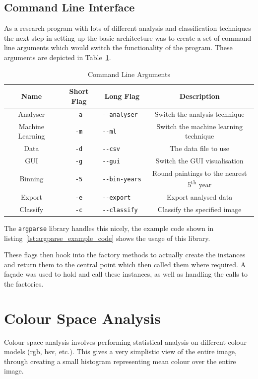 \subsection{Command Line Interface}
As a research program with lots of different analysis and classification techniques the next step
in setting up the basic architecture was to create a set of command-line arguments which would
switch the functionality of the program. These arguments are depicted in Table~\ref{tab:args}.

\begin{table}[h]
\centering
\begin{tabular}{|c|c|c|c|} \hline
Name             & Short Flag & Long Flag         & Description\\\hline
Analyser         & \verb+-a+  & \verb+--analyser  +& Switch the analysis technique\\
Machine Learning & \verb+-m+  & \verb+--ml        +& Switch the machine learning technique\\
Data             & \verb+-d+  & \verb+--csv       +& The data file to use\\
GUI              & \verb+-g+  & \verb+--gui       +& Switch the GUI visualisation\\
Binning          & \verb+-5+  & \verb+--bin-years +& Round paintings to the nearest 5\textsuperscript{th} year\\
Export           & \verb+-e+  & \verb+--export    +& Export analysed data\\
Classify         & \verb+-c+  & \verb+--classify  +& Classify the specified image\\
\hline
\end{tabular}
\caption{Command Line Arguments}\label{tab:args}
\end{table}

The \texttt{argparse} library handles this nicely, the example code shown in 
listing~\ref{lst:argparse_example_code} shows the usage of this library.

These flags then hook into the factory methods to actually create the instances and return them to
the central point which then called them where required. A 
fa\c{c}ade\cite[p.185-194]{Gamma1996Design} was used to hold and call these instances, as well as
handling the calls to the factories.


\section{Colour Space Analysis}
Colour space analysis involves performing statistical analysis on different colour models 
(\gls{rgb}, \gls{hsv}, etc.). This gives a very simplistic view of the entire image, through 
creating a small histogram representing mean colour over the entire image.

